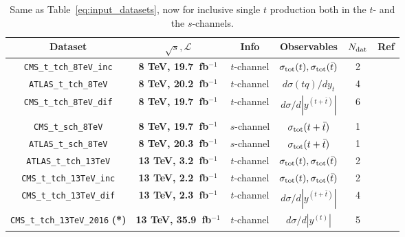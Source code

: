 \begin{table}[t]
  \centering
  \scriptsize
   \renewcommand{\arraystretch}{1.60}
  \begin{tabular}{c|c|c|c|c|c}
 Dataset   &  $\sqrt{s}, \mathcal{L}$ & Info  &  Observables  & $N_{\rm dat}$ & Ref   \\
\toprule
    {\tt CMS\_t\_tch\_8TeV\_inc}
    & {\bf 8 TeV, 19.7~{\rm \bf fb}$^{-1}$ }
    & $t$-channel
    & $\sigma_{\rm tot}(t),\sigma_{\rm tot}(\bar{t})$  & 2
    & \cite{Khachatryan:2014iya}  \\
\midrule
    {\tt ATLAS\_t\_tch\_8TeV}
    & {\bf 8 TeV, 20.2~{\rm \bf fb}$^{-1}$}
    & $t$-channel
    & $d\sigma(tq)/dy_t$
    & 4
    & \cite{Aaboud:2017pdi}  \\
\midrule
    {\tt CMS\_t\_tch\_8TeV\_dif}
    & {\bf 8 TeV, 19.7~{\rm \bf fb}$^{-1}$}
    & $t$-channel
    & $d\sigma/d|y^{(t+\bar{t})}|$
    & 6
    & \cite{CMS-PAS-TOP-14-004}  \\
\midrule
    {\tt CMS\_t\_sch\_8TeV}
    & {\bf 8 TeV, 19.7~{\rm \bf fb}$^{-1}$}
    & $s$-channel
    & $\sigma_{\rm tot}(t+\bar{t})$
    & 1
    & \cite{Khachatryan:2016ewo}  \\
\midrule
    {\tt ATLAS\_t\_sch\_8TeV}
    & {\bf 8 TeV, 20.3~{\rm \bf fb}$^{-1}$ }
    & $s$-channel
    & $\sigma_{\rm tot}(t+\bar{t})$
    & 1
    & \cite{Aad:2015upn}  \\
\midrule
\midrule
    {\tt ATLAS\_t\_tch\_13TeV}
    & {\bf 13 TeV, 3.2~{\rm \bf fb}$^{-1}$}
    & $t$-channel
    & $\sigma_{\rm tot}(t),\sigma_{\rm tot}(\bar{t})$
    & 2
    & \cite{Aaboud:2016ymp}  \\
    \midrule
    {\tt CMS\_t\_tch\_13TeV\_inc}
    & {\bf 13 TeV, 2.2~{\rm \bf fb}$^{-1}$}
    & $t$-channel
    & $\sigma_{\rm tot}(t),\sigma_{\rm tot}(\bar{t})$
    & 2
    & \cite{Sirunyan:2016cdg}  \\
    \midrule
    {\tt CMS\_t\_tch\_13TeV\_dif}
    & {\bf 13 TeV, 2.3~{\rm \bf fb}$^{-1}$}
    & $t$-channel
    & $d\sigma/d|y^{(t+\bar{t})}|$
    & 4
    & \cite{CMS:2016xnv}  \\
    \midrule
    {\tt CMS\_t\_tch\_13TeV\_2016} {\bf (*)}
    & {\bf 13 TeV, 35.9~{\rm \bf fb}$^{-1}$}
    & $t$-channel
    & $d\sigma/d|y^{(t)}|$
    & 5
    & \cite{Sirunyan:2019hqb}  \\
\bottomrule
  \end{tabular}
  \caption{\small Same as Table~\ref{eq:input_datasets},
    now for inclusive single $t$ production both in the $t$- and the $s$-channels.
     \label{eq:input_datasets3}
  }
\end{table}
